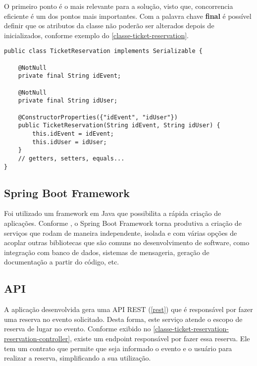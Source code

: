 
O primeiro ponto é o mais relevante para a solução, visto que, concorrencia
eficiente é um dos pontos mais importantes. Com a palavra chave \textbf{final} é
possível definir que os atributos da classe não poderão ser alterados depois
de inicializados, conforme exemplo do \autoref{classe-ticket-reservation}.

\begin{lstlisting}[label=classe-ticket-reservation,caption=Classe TicketReservation em Java]
public class TicketReservation implements Serializable {

    @NotNull
    private final String idEvent;

    @NotNull
    private final String idUser;

    @ConstructorProperties({"idEvent", "idUser"})
    public TicketReservation(String idEvent, String idUser) {
        this.idEvent = idEvent;
        this.idUser = idUser;
    }
    // getters, setters, equals...
}
\end{lstlisting}

\subsection{Spring Boot Framework}

Foi utilizado um framework em Java que possibilita a rápida criação de aplicações.
Conforme \cite[8]{spring-boot-reference-guide}, o Spring Boot Framework torna
produtiva a criação de serviços que rodam de maneira independente, isolada
e com várias opções de acoplar outras bibliotecas que são comuns no desenvolvimento
de software, como integração com banco de dados, sistemas de mensageria, geração
de documentação a partir do código, etc.


\subsection{API}

A aplicação desenvolvida gera uma API REST (\autoref{rest}) que é responsável por fazer uma reserva
no evento solicitado. Desta forma, este serviço atende o escopo de reserva de lugar no
evento. Conforme exibido no \autoref{classe-ticket-reservation-reservation-controller}, existe um endpoint responsável
por fazer essa reserva. Ele tem um contrato que permite que seja informado o evento e
o usuário para realizar a reserva, simplificando a sua utilização.

